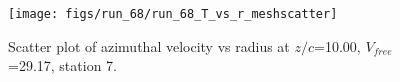 \begin{figure}[H]
\centering
\texttt{[image: figs/run\_68/run\_68\_T\_vs\_r\_meshscatter]}
\caption{Scatter plot of azimuthal velocity vs radius at $z/c$=10.00, $V_{free}$=29.17, station 7.}
\label{fig:run_68_T_vs_r_meshscatter}
\end{figure}


